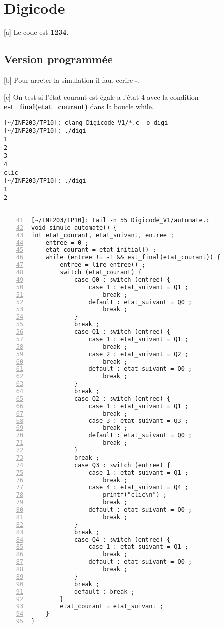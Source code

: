 \documentclass[12pt,a4paper,notitlepage,colorinlistoftodos]{article}
\begin{document}

\section{Digicode}

[a]
Le code est \textbf{1234}.

\subsection{Version programmée}

[b]
Pour arreter la simulation il faut ecrire \textbf{-}.

[c]
On test si l'état courant est égale a l'état 4 avec la condition \textbf{est\_final(etat\_courant)} dans la boucle while.

\begin{lstlisting}[language = rshell]
[~/INF203/TP10]: clang Digicode_V1/*.c -o digi
[~/INF203/TP10]: ./digi 
1
2
3
4
clic
[~/INF203/TP10]: ./digi 
1
2
-
\end{lstlisting}

\begin{lstlisting}[numbers=left, firstnumber = 41]
[~/INF203/TP10]: tail -n 55 Digicode_V1/automate.c
void simule_automate() {
int etat_courant, etat_suivant, entree ;
	entree = 0 ;
	etat_courant = etat_initial() ;
	while (entree != -1 && est_final(etat_courant)) {
		entree = lire_entree() ;
		switch (etat_courant) {
			case Q0 : switch (entree) {
				case 1 : etat_suivant = Q1 ; 
				 	break ;
				default : etat_suivant = Q0 ; 
				 	break ;
			}	
			break ;
			case Q1 : switch (entree) {
				case 1 : etat_suivant = Q1 ; 
					break ;
				case 2 : etat_suivant = Q2 ; 
					break ;
				default : etat_suivant = Q0 ; 
					break ;
			}
			break ;
			case Q2 : switch (entree) {
				case 1 : etat_suivant = Q1 ; 
					break ;
				case 3 : etat_suivant = Q3 ; 
					break ;
				default : etat_suivant = Q0 ; 
					break ;
			}
			break ;
			case Q3 : switch (entree) {
				case 1 : etat_suivant = Q1 ; 
					break ;
				case 4 : etat_suivant = Q4 ; 
					printf("clic\n") ;
					break ;
				default : etat_suivant = Q0 ; 
					break ;
			}
			break ;
			case Q4 : switch (entree) {
				case 1 : etat_suivant = Q1 ; 
					break ;
				default : etat_suivant = Q0 ; 
					break ;
			}
			break ;
			default : break ;
		}
		etat_courant = etat_suivant ;
	}
}
\end{lstlisting}
\end{document}
